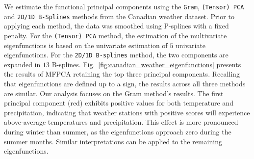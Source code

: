We estimate the functional principal components using the \texttt{Gram}, \texttt{(Tensor) PCA} and \texttt{2D/1D B-Splines} methods from the Canadian weather dataset. Prior to applying each method, the data was smoothed using P-splines with a fixed penalty. For the \texttt{(Tensor) PCA} method, the estimation of the multivariate eigenfunctions is based on the univariate estimation of $5$ univariate eigenfunctions. For the \texttt{2D/1D B-splines} method, the two components are expanded in $13$ B-splines.  Fig.~\ref{fig:canadian_weather_eigenfunctions} presents the results of MFPCA retaining the top three principal components. Recalling that eigenfunctions are defined up to a sign, the results across all three methods are similar. Our analysis focuses on the Gram method's results. The first principal component (red) exhibits positive values for both temperature and precipitation, indicating that weather stations with positive scores will experience above-average temperatures and precipitation. This effect is more pronounced during winter than summer, as the eigenfunctions approach zero during the summer months. Similar interpretations can be applied to the remaining eigenfunctions.

